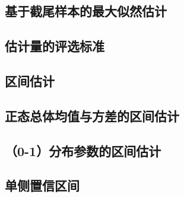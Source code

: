 \documentclass[UTF8,10pt]{ctexart}
\begin{document}
	\subsection{基于截尾样本的最大似然估计}
	
	\subsection{估计量的评选标准}
	
	\subsection{区间估计}
	
	\subsection{正态总体均值与方差的区间估计}
	
	\subsection{（0-1）分布参数的区间估计}
	
	\subsection{单侧置信区间}
	
\end{document}
